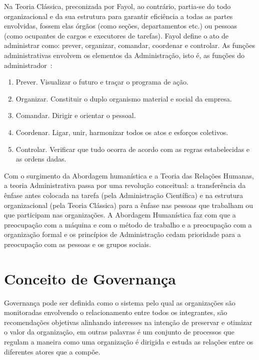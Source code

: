 Na Teoria Clássica, preconizada por Fayol, ao contrário, partia-se do todo 
organizacional e da sua estrutura para garantir eficiência a todas as partes 
envolvidas, fossem elas órgãos (como seções, departamentos etc.) ou pessoas 
(como ocupantes de cargos e executores de tarefas).
%
Fayol define o ato de administrar como: prever, organizar, comandar, coordenar 
e controlar. As funções administrativas envolvem os elementos da Administração, 
isto é, as funções do administrador~\cite{chiavenato2001teoria}:

\begin{enumerate}

\item Prever. Visualizar o futuro e traçar o programa de ação.

\item Organizar. Constituir o duplo organismo material e social da empresa.

\item Comandar. Dirigir e orientar o pessoal.

\item Coordenar. Ligar, unir, harmonizar todos os atos e esforços coletivos.

\item Controlar. Verificar que tudo ocorra de acordo com as regras estabelecidas 
e as ordens dadas.

\end{enumerate}

Com o surgimento da Abordagem humanística e a Teoria das Relações Humanas,
a teoria Administrativa passa por uma revolução conceitual: a transferência da 
ênfase antes colocada na tarefa (pela Administração Científica) e na estrutura 
organizacional (pela Teoria Clássica) para a ênfase nas pessoas que trabalham 
ou que participam nas organizações. A Abordagem Humanística faz com que a
preocupação com a máquina e com o método de trabalho e a preocupação com a 
organização formal e os princípios de Administração cedam prioridade para a 
preocupação com as pessoas e os grupos sociais.


\section{Conceito de Governança}

Governança pode ser definida como o sistema pelo qual as organizações 
são monitoradas envolvendo o relacionamento entre todos os integrantes,
são recomendações objetivas alinhando interesses na intenção de preservar e 
otimizar o valor da organização, em outras palavras é um conjunto de processos
que regulam a maneira como uma organização é dirigida e estuda as relações entre 
os diferentes atores que a compõe\cite{molinarogestao}.

